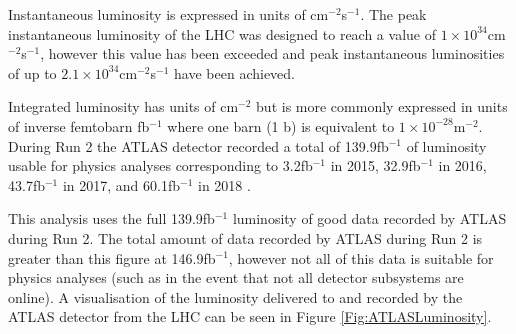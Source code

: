 \documentclass[12pt,a4paper,epsf,portrait,times,epsfig]{article}
\begin{document}
		Instantaneous luminosity is expressed in units of cm$^{-2}$s$^{-1}$. The peak instantaneous luminosity of the LHC was designed to reach a value of $1 \times 10^{34}$cm$^{-2}$s$^{-1}$, however this value has been exceeded and peak instantaneous luminosities of up to $2.1 \times 10^{34}$cm$^{-2}$s$^{-1}$ have been achieved. \par
		
		Integrated luminosity has units of cm$^{-2}$ but is more commonly expressed in units of inverse femtobarn fb$^{-1}$ where one barn (1 b) is equivalent to $1 \times 10^{-28} $m$^{-2}$. During Run 2 the ATLAS detector recorded a total of 139.9fb$^{-1}$ of luminosity usable for physics analyses corresponding to 3.2fb$^{-1}$ in 2015, 32.9fb$^{-1}$ in 2016, 43.7fb$^{-1}$ in 2017, and 60.1fb$^{-1}$ in 2018 \cite{ATLASLumiPublic}. \par
		
		This analysis uses the full 139.9fb$^{-1}$ luminosity of good data recorded by ATLAS during Run 2. The total amount of data recorded by ATLAS during Run 2 is greater than this figure at 146.9fb$^{-1}$, however not all of this data is suitable for physics analyses (such as in the event that not all detector subsystems are online). A visualisation of the luminosity delivered to and recorded by the ATLAS detector from the LHC can be seen in Figure \ref{Fig:ATLASLuminosity}.
\end{document}
